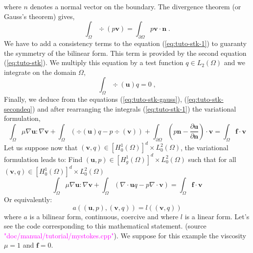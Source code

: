 %
where $n$ denotes a normal vector on the boundary.
The divergence theorem (or Gauss's theorem) gives,
%
\begin{equation}
\int_\Omega \div(p \mathbf v) = \int_{\partial\Omega} p \mathbf v\cdot \mathbf n \;.
\label{eq:tuto-stk-gauss}
\end{equation}
%
We have to add a consistency terms to the equation (\ref{eq:tuto-stk-1}) to
guaranty the symmetry of the bilinear form.
This term is provided by the second equation (\ref{eq:tuto-stk}). We multiply this equation
by a test function $q\in L_2(\Omega)$ and we integrate on the domain $\Omega$,
%
\begin{equation}
\int_{\Omega} \div(\mathbf u) q = 0 \;,
\label{eq:tuto-stk-secondeq}
\end{equation}
%
Finally, we deduce from the equations (\ref{eq:tuto-stk-gauss}), (\ref{eq:tuto-stk-secondeq})
and after rearranging the integrals (\ref{eq:tuto-stk-1}) the variational formulation,
%
\begin{equation}
\int_\Omega \mu \nabla \mathbf u :\nabla \mathbf v
+\int_\Omega \left( \div(\mathbf u) q - p \div(\mathbf v) \right)
+
    \int_{\partial\Omega} \left( p \mathbf n - 
 \frac{\partial \mathbf u}{\partial \mathbf n}\right)
     \cdot \mathbf v
=\int_\Omega \mathbf f \cdot \mathbf v 
\label{eq:tuto-stk-varform}
\end{equation}
%
Let us suppose now that $(\mathbf v,q) \in [H_0^1(\Omega)]^d \times L_0^2(\Omega)$, the variational formulation leads to:
Find $(\mathbf{u},p)\in [H_g^1(\Omega)]^d\times L_0^2(\Omega)$ such that for all $(\mathbf{v},q) \in [H_0^1(\Omega)]^d \times L_0^2(\Omega)$
\begin{equation}
\int_\Omega \mu \nabla \mathbf{u} :\nabla \mathbf{v}
+\int_\Omega \left( \nabla\cdot\mathbf{u} q - p \nabla\cdot\mathbf{v} \right)
=\int_\Omega \mathbf{f} \cdot \mathbf{v}
\end{equation}
Or equivalently:
\begin{equation}
  a((\mathbf{u},p),(\mathbf{v},q)) = l((\mathbf{v},q))
\end{equation}
where $a$ is a bilinear form, continuous, coercive and where $l$ is a linear form.
Let's see the \feel code corresponding to this mathematical statement.
(source \textcolor{magenta}{"doc/manual/tutorial/mystokes.cpp"}).
We suppose for this example the viscosity $\mu=1$ and $\mathbf f = 0$.
%
\vspace{2mm}

\vspace{2mm}
%

